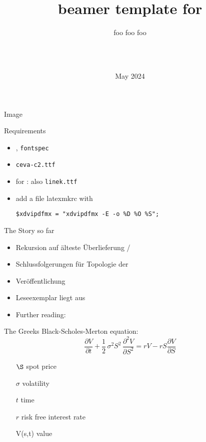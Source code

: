 \documentclass[t,dvipsnames]{beamer}
\title{beamer template for \ceva{c-base}}
\subtitle{foo foo foo}
\author{\ceva{c-base cience ring}\\\ceva{\&}\\\ceva{penta - ms. cience}}%
\date{May 2024}
\begin{document}
\frame{\titlepage}

\begin{frame}{Image}
    \resizebox{!}{0.8\textheight}{}
\end{frame}

\begin{frame}{Requirements}
    \begin{itemize}
        \item \XeLaTeX, \texttt{fontspec}
        \item \texttt{ceva-c2.ttf}
        \item for : also \texttt{linek.ttf}
        \item add a file latexmkrc with
        \item[]  \texttt{\$xdvipdfmx = "xdvipdfmx -E -o \%D \%O \%S";}
    \end{itemize}
\end{frame}

\begin{frame}{The Story so far}
\end{frame}

\begin{frame}{}
    \begin{itemize}
        \item Rekursion auf älteste Überlieferung / 
        \item Schlussfolgerungen für Topologie der 
        \item Veröffentlichung  \cite{penta2024}
        \item Leseexemplar liegt aus
        \item Further reading: \cite{adams1981restaurant}
    \end{itemize}
\end{frame}

\begin{frame}{The Greeks}
    Black-Scholes-Merton equation:
        \begin{equation}
            \frac{\partial V}{\partial t}
            +
            \frac{1}{2}\, \sigma^2 S^2  \,
            \frac{\partial^2V}{\partial S^2}
            =
            rV
            -
            rS\frac{\partial V}{\partial S}
        \end{equation}
        \hspace{20ex}
        \parbox{\textwidth}{
            \begin{itemize}
                \item[$\S$] spot price
                \item[$\sigma$]  volatility
                \item[$t$] time
                \item[$r$] risk free interest rate
                \item[V(s,t)] value
            \end{itemize}
            }
\end{frame}
\end{document}
